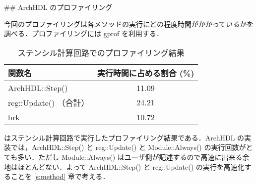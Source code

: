 ## ArchHDL のプロファイリング \label{ss:profiling}

今回のプロファイリングは各メソッドの実行にどの程度時間がかかっているかを調べる．プロファイリングには
gprof を利用する．

\begin{table}[t]
 \caption{ステンシル計算回路でのプロファイリング結果}
 \label{table:stencil_prof}
 \begin{center}
  \begin{tabular}{lc} \toprule
  関数名 & 実行時間に占める割合 (\%) \\ \midrule
  ArchHDL::Step() & 11.09 \\
  reg::Update() （合計） & 24.21 \\
  brk & 10.72 \\ \bottomrule
  \end{tabular}
 \end{center}
\end{table}


 はステンシル計算回路で実行したプロファイリング結果である．ArchHDL の実装では，ArchHDL::Step() と reg::Update() と Module::Always() の実行回数がとても多い．ただし Module::Always() はユーザ側が記述するので高速に出来る余地はほとんどない．よって ArchHDL::Step() と reg::Update() の実行を高速化することを \ref{s:method} 章で考える．

